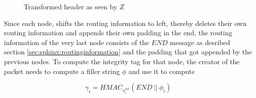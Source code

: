 \begin{figure}[H]
    \caption{Transformed header as seen by $Z$}
\end{figure}

Since each node, shifts the routing information to left, thereby deletes their own routing information and appends their own padding in the end, the routing information of the very last node consists of the $END$ message as desribed section \ref{sec:sphinx:routinginformation} and the padding that got appended by the previous nodes. To compute the integrity tag for that node, the creator of the packet needs to compute a filler string $\phi$ and use it to compute

$$\gamma_i = HMAC_{s_i^{int}}(END \ || \ \phi_i )$$
